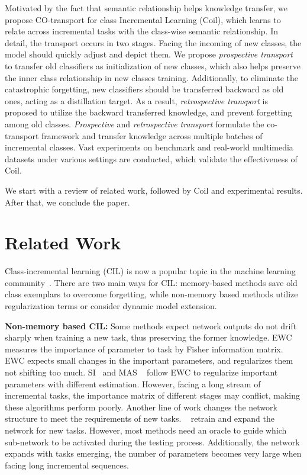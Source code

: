 \documentclass[sigconf]{acmart}
\newcommand{\name}{{\sc Coil }}
\newcommand{\mame}{{\sc Coil}}
\begin{document}
Motivated by the fact that semantic relationship helps knowledge transfer, we propose CO-transport for class Incremental Learning (\mame), which learns to relate  across incremental tasks with the class-wise semantic relationship. 
In detail, the transport occurs in two stages. Facing the incoming of new classes, the model should quickly adjust and depict them. We propose \emph{prospective transport} to transfer old classifiers as initialization of new classes, which also helps  preserve the inner class relationship in new classes training. Additionally, to eliminate  the catastrophic forgetting, new classifiers should be transferred backward as old ones, acting as a distillation target. As a result, \emph{retrospective transport} is proposed to utilize the backward transferred knowledge, and prevent forgetting among old classes.
\emph{Prospective} and \emph{retrospective transport}  formulate the co-transport framework and transfer knowledge across multiple batches of incremental classes.
Vast experiments on benchmark and real-world multimedia datasets under various settings are conducted, which validate the effectiveness of \mame.



We start with a review of related work, followed by \name and experimental results. After that, we conclude the paper.


\section{Related Work}

Class-incremental learning (CIL)  is now a popular topic in the machine learning community~\cite{de2019continual,Zhang_2021_CVPR,Cheraghian_2021_CVPR,Liu_2021_CVPR,Wu_2021_CVPR,tao2020few,Zhu_2021_CVPRb,Zhu_2021_CVPR,Hu_2021_CVPR}. There are  two main ways for CIL: memory-based methods save old class exemplars to overcome forgetting, while non-memory based methods utilize regularization terms or consider dynamic model extension.

{\bf Non-memory based CIL:} Some methods expect network outputs do not drift sharply when training a new task, thus preserving the former knowledge. EWC~\cite{kirkpatrick2017overcoming} measures the importance of parameter to task by Fisher information matrix. EWC expects small changes in the important parameters, and regularizes them not shifting too much. SI~\cite{zenke2017continual} and MAS ~\cite{aljundi2018memory} follow EWC to regularize important parameters with different estimation. However, facing a long stream of incremental tasks, the importance matrix of different stages may conflict, making these algorithms perform poorly.
Another line of work changes the network structure to meet the requirements of new tasks. 
~\cite{yoon2018lifelong,xu2018reinforced} retrain and expand the  network for new tasks.
However, most methods need an oracle to guide which sub-network to be activated during the testing process. Additionally, the network expands with tasks emerging, the number of parameters becomes very large when facing long incremental sequences.
\end{document}
